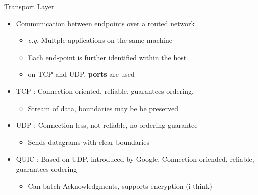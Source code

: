 \begin{frame}{Transport Layer}
	\begin{itemize}
		\item Communication between endpoints over a routed network
			\begin{itemize}
				\item \textit{e.g.} Multple applications on the same machine
				\item Each end-point is further identified within the host 
				\item on TCP and UDP, \textbf{ports} are used
			\end{itemize}
		\item TCP : Connection-oriented, reliable, guarantees ordering.
			\begin{itemize}
				\item Stream of data, boundaries may be be preserved 
			\end{itemize}
		\item UDP : Connection-less, not reliable, no ordering guarantee
			\begin{itemize}
				\item Sends datagrams with clear boundaries
			\end{itemize}
		\item QUIC : Based on UDP, introduced by Google. Connection-oriended, reliable, guarantees ordering
			\begin{itemize}
				\item Can batch Acknowledgments, supports encryption (i think)
			\end{itemize}

	\end{itemize}
\end{frame}

